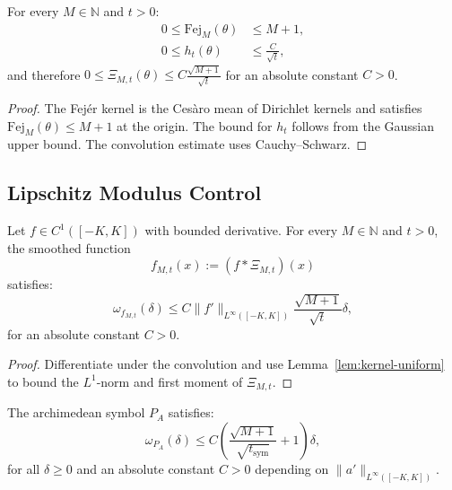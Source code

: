 \begin{lemma}\label{lem:kernel-uniform}
For every $M \in \mathbb{N}$ and $t > 0$:
\begin{align}
  0 \leq \mathrm{Fej}_M(\theta) &\leq M+1, \\
  0 \leq h_t(\theta) &\leq \frac{C}{\sqrt{t}},
\end{align}
and therefore $0 \leq \Xi_{M,t}(\theta) \leq C \frac{\sqrt{M+1}}{\sqrt{t}}$ for an absolute constant $C > 0$.
\end{lemma}

\begin{proof}
The Fej\'er kernel is the Ces\`aro mean of Dirichlet kernels and satisfies $\mathrm{Fej}_M(\theta) \leq M+1$ at the origin. The bound for $h_t$ follows from the Gaussian upper bound. The convolution estimate uses Cauchy--Schwarz.
\end{proof}

\subsection{Lipschitz Modulus Control}

\begin{lemma}\label{lem:fejer-lip}
Let $f \in C^1([-K, K])$ with bounded derivative. For every $M \in \mathbb{N}$ and $t > 0$, the smoothed function
\begin{equation}
  f_{M,t}(x) := (f * \Xi_{M,t})(x)
\end{equation}
satisfies:
\begin{equation}
  \omega_{f_{M,t}}(\delta) \leq C \|f'\|_{L^\infty([-K, K])} \frac{\sqrt{M+1}}{\sqrt{t}} \delta,
\end{equation}
for an absolute constant $C > 0$.
\end{lemma}

\begin{proof}
Differentiate under the convolution and use Lemma~\ref{lem:kernel-uniform} to bound the $L^1$-norm and first moment of $\Xi_{M,t}$.
\end{proof}

\begin{corollary}\label{cor:omega-arch}
The archimedean symbol $P_A$ satisfies:
\begin{equation}
  \omega_{P_A}(\delta) \leq C \left( \frac{\sqrt{M+1}}{\sqrt{t_{\mathrm{sym}}}} + 1 \right) \delta,
\end{equation}
for all $\delta \geq 0$ and an absolute constant $C > 0$ depending on $\|a'\|_{L^\infty([-K, K])}$.
\end{corollary}

